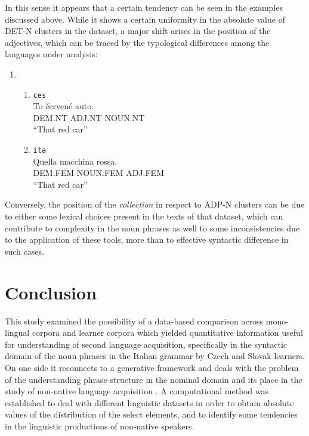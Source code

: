 \documentclass[
  a4paper,
  twoside,
  12pt,
  chapterprefix=false,
  listof=flat]{scrartcl}
\providecommand{\tightlist}{%
  \setlength{\itemsep}{0pt}\setlength{\parskip}{0pt}}
\theoremstyle{plain} %
\theoremstyle{definition}
\theoremstyle{remark}
\begin{document}
In this sense it appears that a certain tendency can be seen in the examples discussed above. While it shows a certain uniformity in the absolute value of DET-N clusters in the dataset, a major shift arises in the position of the adjectives, which can be traced by the typological differences among the languages under analysis:

\begin{enumerate}
\def\labelenumi{(\arabic{enumi})}
\setcounter{enumi}{3}
\item
  \begin{enumerate}
  \def\labelenumii{\alph{enumii}.}
  \tightlist
  \item
    \texttt{ces} \label{exm:adjCes}\\
    \gll    To červené auto.\\
    DEM.NT ADJ.NT NOUN.NT\\
    \glt    \enquote{That red car}
  \item
    \texttt{ita} \label{exm:adjIta}\\
    \gll    Quella macchina rossa.\\
    DEM.FEM NOUN.FEM ADJ.FEM\\
    \glt    \enquote{That red car}
  \end{enumerate}
\end{enumerate}

Conversely, the position of the \emph{collection} in respect to ADP-N clusters can be due to either some lexical choices present in the texts of that dataset, which can contribute to complexity in the noun phrases as well to some inconsistencies due to the application of these tools, more than to effective syntactic difference in such cases.

\hypertarget{sec:concl}{%
\section{Conclusion}\label{sec:concl}}

This study examined the possibility of a data-based comparison across mono-lingual corpora and learner corpora which yielded quantitative information useful for understanding of second language acquisition, specifically in the syntactic domain of the noun phrases in the Italian grammar by Czech and Slovak learners.
On one side it reconnects to a generative framework and deals with the problem of the understanding phrase structure in the nominal domain \citep[\citet{bernstein2008}, \citet{zamparelli1995}]{abney1987} and its place in the study of non-native language acquisition \citep{rothmanslabakova2017}.
A computational method was established to deal with different linguistic datasets \citep{sinclair2005} in order to obtain absolute values of the distribution of the select elements, and to identify some tendencies in the linguistic productions of non-native speakers.
\end{document}
